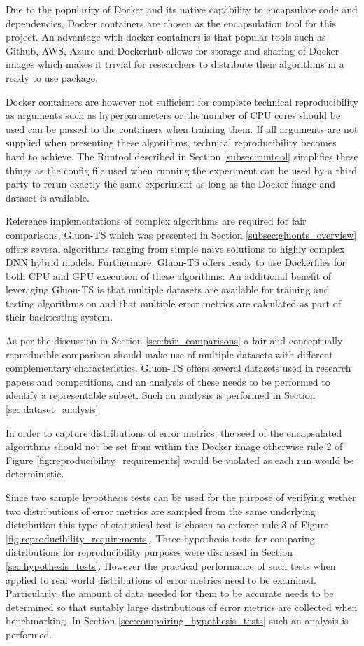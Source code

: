 Due to the popularity of Docker and its native capability to encapsulate code and dependencies, Docker containers are chosen as the encapsulation tool for this project. An advantage with docker containers is that popular tools such as Github, AWS, Azure and Dockerhub allows for storage and sharing of Docker images which makes it trivial for researchers to distribute their algorithms in a ready to use package.

Docker containers are however not sufficient for complete technical reproducibility as arguments such as hyperparameters or the number of CPU cores should be used can be passed to the containers when training them. If all arguments are not supplied when presenting these algorithms, technical reproducibility becomes hard to achieve. The Runtool described in Section \ref{subsec:runtool} simplifies these things as the config file used when running the experiment can be used by a third party to rerun exactly the same experiment as long as the Docker image and dataset is available.

Reference implementations of complex algorithms are required for fair comparisons, Gluon-TS which was presented in Section \ref{subsec:gluonts_overview} offers several algorithms ranging from simple naive solutions to highly complex DNN hybrid models. Furthermore, Gluon-TS offers ready to use Dockerfiles for both CPU and GPU execution of these algorithms. An additional benefit of leveraging Gluon-TS is that multiple datasets are available for training and testing algorithms on and that multiple error metrics are calculated as part of their backtesting system.

As per the discussion in Section \ref{sec:fair_comparisons} a fair and conceptually reproducible comparison should make use of multiple datasets with different complementary characteristics. Gluon-TS offers several datasets used in research papers and competitions, and an analysis of these needs to be performed to identify a representable subset. Such an analysis is performed in Section \ref{sec:dataset_analysis}

In order to capture distributions of error metrics, the seed of the encapsulated algorithms should not be set from within the Docker image otherwise rule 2 of Figure \ref{fig:reproducibility_requirements} would be violated as each run would be deterministic.

Since two sample hypothesis tests can be used for the purpose of verifying wether two distributions of error metrics are sampled from the same underlying distribution this type of statistical test is chosen to enforce rule 3 of Figure \ref{fig:reproducibility_requirements}. Three hypothesis tests for comparing distributions for reproducibility purposes were discussed in Section \ref{sec:hypothesis_tests}. However the practical performance of such tests when applied to real world distributions of error metrics need to be examined. Particularly, the amount of data needed for them to be accurate needs to be determined so that suitably large distributions of error metrics are collected when benchmarking. In Section \ref{sec:compairing_hypothesis_tests} such an analysis is performed.

